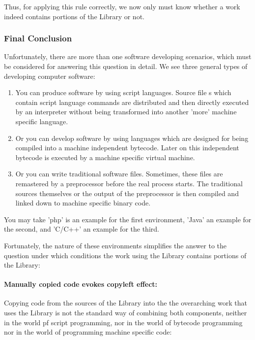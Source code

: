 Thus, for applying this rule correctly, we now only must know whether a work
indeed contains portions of the Library or not.

\subsubsection{Final Conclusion}

Unfortunately, there are more than one software developing scenarios, which must
be considered for answering this question in detail. We see three general types
of developing computer software:

\begin{enumerate}
  \item You can produce software by using script languages. Source file s
  which contain script language commands are distributed and then directly
  executed by an interpreter without being transformed into another 'more'
  machine specific language.
  \item Or you can develop software by using languages which are designed for
  being compiled into a machine independent bytecode. Later on this independent
  bytecode is executed by a machine specific virtual machine.
  \item  Or you can write traditional software files. Sometimes, these files are
  remastered by a preprocessor before the real process starts. The traditional
  sources themselves or the output of the preprocessor is then compiled and
  linked down to machine specific binary code.
\end{enumerate}
  
You may take 'php' is an example for the first environment, 'Java' an example
for the second, and 'C/C++' an example for the third.

Fortunately, the nature of these environments simplifies the answer to the
question under which conditions the work using the Library contains portions of
the Library:

\paragraph{Manually copied code evokes copyleft effect:} 

Copying code from the sources of the Library into the the overarching work that
uses the Library is not the standard way of combining both components, neither
in the world pf script programming, nor in the world of bytecode programming
nor in the world of programming machine specific code:

